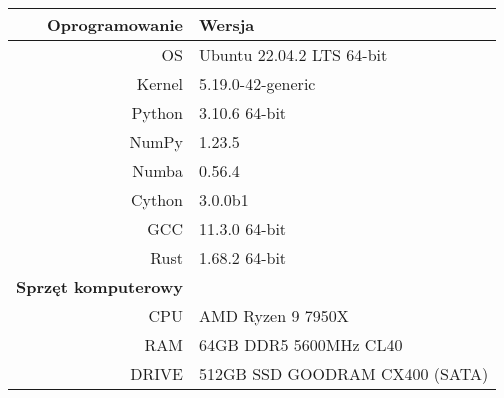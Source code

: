 \begin{tabularx}{\textwidth}{r|l}
    \midrule
    \textbf{Oprogramowanie}   & \textbf{Wersja}                         \\
    \midrule
    OS                        & Ubuntu 22.04.2 LTS 64-bit         \\
    Kernel                    & 5.19.0-42-generic                 \\
    Python                    & 3.10.6 64-bit                     \\
    NumPy                     & 1.23.5                            \\
    Numba                     & 0.56.4                            \\
    Cython                    & 3.0.0b1                           \\
    GCC                       & 11.3.0 64-bit                     \\
    Rust                      & 1.68.2 64-bit                     \\
    \midrule
    \textbf{Sprzęt komputerowy} &                       \\
    \midrule
    CPU                       & AMD Ryzen 9 7950X                 \\
    RAM                       & 64GB DDR5 5600MHz CL40            \\
    DRIVE                     & 512GB SSD GOODRAM CX400 (SATA)    \\\midrule
  \end{tabularx}